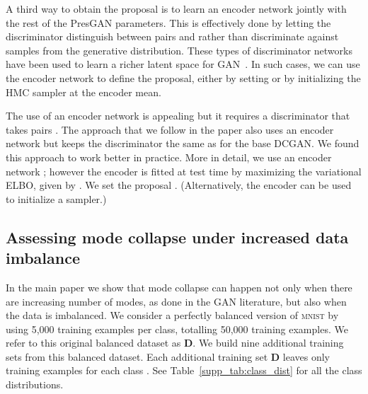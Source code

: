 \documentclass[11pt]{article}
\begin{document}
A third way to obtain the proposal is to learn an encoder network  jointly with the rest of the Pres\acrshort{GAN} parameters. This is effectively done by letting the discriminator distinguish between pairs  and  rather than discriminate  against samples from the generative distribution. These types of discriminator networks have been used to learn a richer latent space for \acrshort{GAN}~\citep{donahue2016adversarial, dumoulin2016adversarially}. 
In such cases, we can use the encoder network  to define the proposal, either by setting  or by initializing the \acrshort{HMC} sampler at the encoder mean.

The use of an encoder network is appealing but it requires a discriminator that takes pairs . The approach that we follow in the paper also uses an encoder network but keeps the discriminator the same as for the base \acrshort{DCGAN}. We found this approach to work better in practice. More in detail, we use an encoder network ; however the encoder is fitted at test time by maximizing the variational \acrshort{ELBO}, given by . We set the proposal . (Alternatively, the encoder can be used to initialize a sampler.)

\subsection{Assessing mode collapse under increased data imbalance}
In the main paper we show that mode collapse can happen not only when there are increasing number of modes, as done in the \gls{GAN} literature, but also when the data is imbalanced. We consider a perfectly balanced version of \textsc{mnist} by using 5,000 training examples per class, totalling 50,000 training examples. We refer to this original balanced dataset as {\bf D}. We build nine additional training sets from this balanced dataset. Each additional training set {\bf D} leaves only  training examples for each class . See Table~\ref{supp_tab:class_dist} for all the class distributions. 
\end{document}
